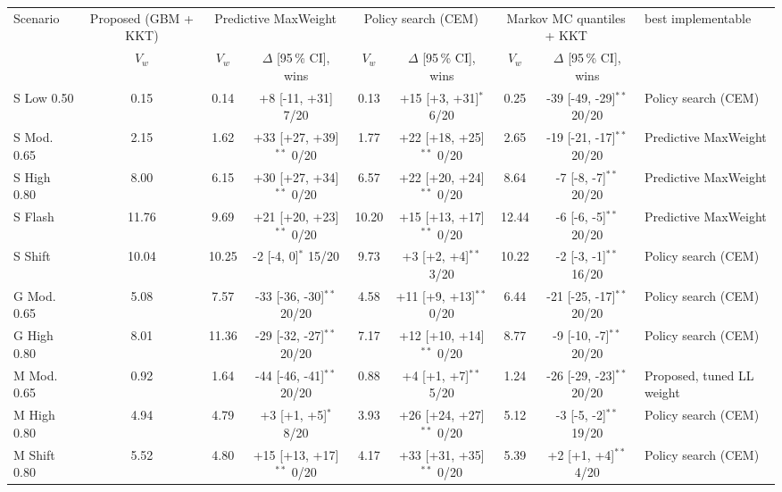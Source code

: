 \begin{tabular}{lcccccccl}
\hline
Scenario & Proposed (GBM + KKT) & \multicolumn{2}{c}{Predictive MaxWeight} & \multicolumn{2}{c}{Policy search (CEM)} & \multicolumn{2}{c}{Markov MC quantiles + KKT} & best implementable \\
 & $V_w$ & $V_w$ & $\Delta$ [95\,\% CI], wins & $V_w$ & $\Delta$ [95\,\% CI], wins & $V_w$ & $\Delta$ [95\,\% CI], wins & \\
\hline
S Low 0.50 & 0.15 & 0.14 & +8 [-11, +31] 7/20 & 0.13 & +15 [+3, +31]$^{\ast}$ 6/20 & 0.25 & -39 [-49, -29]$^{\ast\ast}$ 20/20 & Policy search (CEM) \\
S Mod. 0.65 & 2.15 & 1.62 & +33 [+27, +39]$^{\ast\ast}$ 0/20 & 1.77 & +22 [+18, +25]$^{\ast\ast}$ 0/20 & 2.65 & -19 [-21, -17]$^{\ast\ast}$ 20/20 & Predictive MaxWeight \\
S High 0.80 & 8.00 & 6.15 & +30 [+27, +34]$^{\ast\ast}$ 0/20 & 6.57 & +22 [+20, +24]$^{\ast\ast}$ 0/20 & 8.64 & -7 [-8, -7]$^{\ast\ast}$ 20/20 & Predictive MaxWeight \\
S Flash & 11.76 & 9.69 & +21 [+20, +23]$^{\ast\ast}$ 0/20 & 10.20 & +15 [+13, +17]$^{\ast\ast}$ 0/20 & 12.44 & -6 [-6, -5]$^{\ast\ast}$ 20/20 & Predictive MaxWeight \\
S Shift & 10.04 & 10.25 & -2 [-4, 0]$^{\ast}$ 15/20 & 9.73 & +3 [+2, +4]$^{\ast\ast}$ 3/20 & 10.22 & -2 [-3, -1]$^{\ast\ast}$ 16/20 & Policy search (CEM) \\
G Mod. 0.65 & 5.08 & 7.57 & -33 [-36, -30]$^{\ast\ast}$ 20/20 & 4.58 & +11 [+9, +13]$^{\ast\ast}$ 0/20 & 6.44 & -21 [-25, -17]$^{\ast\ast}$ 20/20 & Policy search (CEM) \\
G High 0.80 & 8.01 & 11.36 & -29 [-32, -27]$^{\ast\ast}$ 20/20 & 7.17 & +12 [+10, +14]$^{\ast\ast}$ 0/20 & 8.77 & -9 [-10, -7]$^{\ast\ast}$ 20/20 & Policy search (CEM) \\
M Mod. 0.65 & 0.92 & 1.64 & -44 [-46, -41]$^{\ast\ast}$ 20/20 & 0.88 & +4 [+1, +7]$^{\ast\ast}$ 5/20 & 1.24 & -26 [-29, -23]$^{\ast\ast}$ 20/20 & Proposed, tuned LL weight \\
M High 0.80 & 4.94 & 4.79 & +3 [+1, +5]$^{\ast}$ 8/20 & 3.93 & +26 [+24, +27]$^{\ast\ast}$ 0/20 & 5.12 & -3 [-5, -2]$^{\ast\ast}$ 19/20 & Policy search (CEM) \\
M Shift 0.80 & 5.52 & 4.80 & +15 [+13, +17]$^{\ast\ast}$ 0/20 & 4.17 & +33 [+31, +35]$^{\ast\ast}$ 0/20 & 5.39 & +2 [+1, +4]$^{\ast\ast}$ 4/20 & Policy search (CEM) \\
\hline
\end{tabular}
